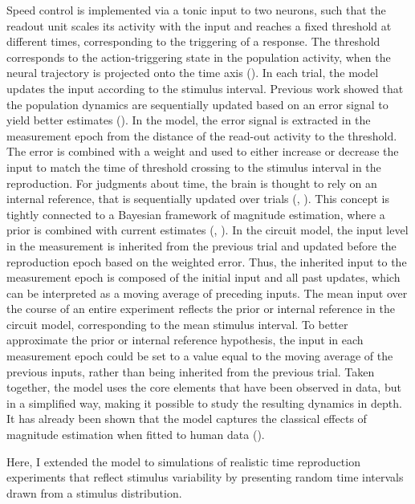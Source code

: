 \documentclass[10pt]{article}
\begin{document}
Speed control is implemented via a tonic input to two neurons, such that the readout unit scales its activity with the input and reaches a fixed threshold at different times, corresponding to the triggering of a response.  
The threshold corresponds to the action-triggering state in the population activity, when the neural trajectory is projected onto the time axis (\cite{Remington2018}).
In each trial, the model updates the input according to the stimulus interval.
Previous work showed that the population dynamics are sequentially updated based on an error signal to yield better estimates (\cite{Egger2019}).
In the model, the error signal is extracted in the measurement epoch from the distance of the read-out activity to the threshold. The error is combined with a weight and used to either increase or decrease the input to match the time of threshold crossing to the stimulus interval in the reproduction.
For judgments about time, the brain is thought to rely on an internal reference, that is sequentially updated over trials (\cite{Dyjas2012}, \cite{Bausenhart2014}). This concept is tightly connected to a Bayesian framework of magnitude estimation, where a prior is combined with current estimates (\cite{Shi2013}, \cite{Petzschner2015}).
In the circuit model, the input level in the measurement is inherited from the previous trial and updated before the reproduction epoch based on the weighted error.
Thus, the inherited input to the measurement epoch is composed of the initial input and all past updates, which can be interpreted as a moving average of preceding inputs. 
The mean input over the course of an entire experiment reflects the prior or internal reference in the circuit model, corresponding to the mean stimulus interval. 
To better approximate the prior or internal reference hypothesis, the input in each measurement epoch could be set to a value equal to the moving average of the previous inputs, rather than being inherited from the previous trial.  
Taken together, the model uses the core elements that have been observed in data, but in a simplified way, making it possible to study the resulting dynamics in depth. 
It has already been shown that the model captures the classical effects of magnitude estimation when fitted to human data (\cite{Egger2020}).

Here, I extended the model to simulations of realistic time reproduction experiments that reflect stimulus variability by presenting random time intervals drawn from a stimulus distribution.
\end{document}

